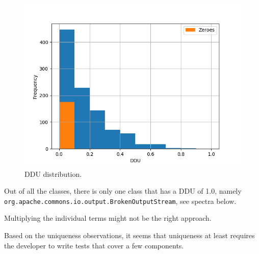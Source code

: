 \documentclass[twoside,a4paper,11pt]{memoir}
\begin{document}
\begin{figure}
    \centering
    \includegraphics[width=\linewidth]{figures/histogram_ddu}
    \caption{DDU distribution.}
    \label{fig:my_label}
\end{figure}

Out of all the classes, there is only one class that has a DDU of 1.0, namely \texttt{org.apache.commons.io.output.BrokenOutputStream}, see spectra below.

\begin{table}[]
\scriptsize
\centering
\caption{My caption}
\label{my-label}
\noindent{}
\end{table}

Multiplying the individual terms might not be the right approach.

Based on the uniqueness observations, it seems that uniqueness at least requires the developer to write tests that cover a few components.
\end{document}

